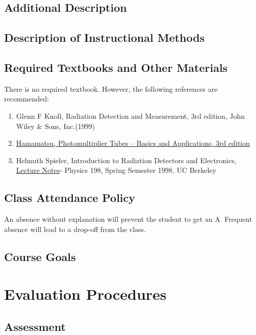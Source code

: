 \documentclass[11pt, letterpaper]{article}
\begin{document}
\subsection{Additional Description}
\label{ss:addi}


\subsection{Description of Instructional Methods}
\label{ss:meth}


\subsection{Required Textbooks and Other Materials}
\label{ss:text}

There is no required textbook. However, the following references are 
recommended:

\begin{enumerate}[label=\arabic*]
\item Glenn F Knoll, Radiation Detection and Measurement, 3rd edition, John 
  Wiley \& Sons, Inc.(1999)
\item 
  \href{https://www.hamamatsu.com/resources/pdf/etd/PMT_handbook_v3aE.pdf}{Hamamatsu, 
  Photomultiplier Tubes – Basics and Applications, 3rd edition}
\item Helmuth Spieler, Introduction to Radiation Detectors and Electronics, 
  \href{http://www-physics.lbl.gov/~spieler/physics_198_notes/}{Lecture Notes}- 
  Physics 198, Spring Semester 1998, UC Berkeley
\end{enumerate}

\subsection{Class Attendance Policy}
\label{ss:atte}

An absence without explanation will prevent the student to get an A. Frequent 
absence will lead to a drop-off from the class.

\subsection{Course Goals}
\label{ss:goal}


\section{Evaluation Procedures}
\label{s:eval}

\subsection{Assessment}
\label{s:asse}
\end{document}

